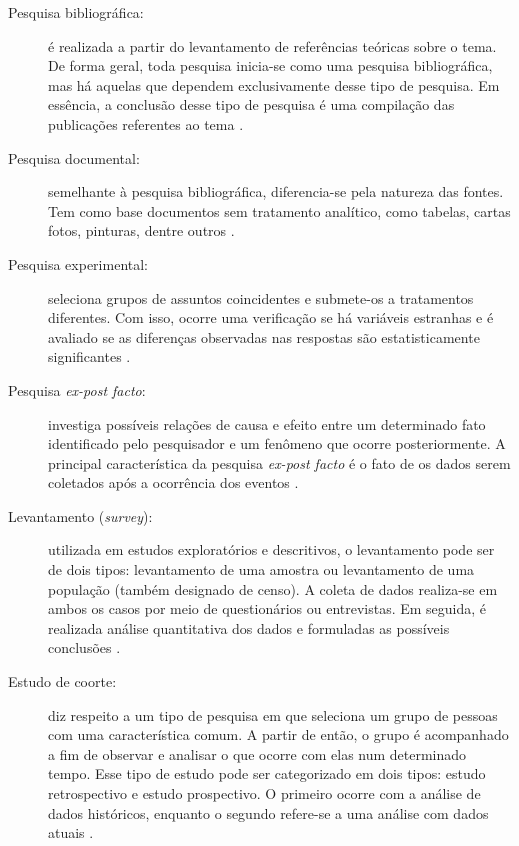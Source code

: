 \begin{description}
\item[Pesquisa bibliográfica:] é realizada a partir do levantamento de referências teóricas sobre o tema. De forma geral, toda pesquisa inicia-se como uma pesquisa bibliográfica, mas há aquelas que dependem exclusivamente desse tipo de pesquisa. Em essência, a conclusão desse tipo de pesquisa é uma compilação das publicações referentes ao tema \cite{prodanov2013}.  

\item[Pesquisa documental:] semelhante à pesquisa bibliográfica, diferencia-se pela natureza das fontes. Tem como base documentos sem tratamento analítico, como tabelas, cartas fotos, pinturas, dentre outros \cite{gil2002}. 

\item[Pesquisa experimental:] seleciona grupos de assuntos coincidentes e submete-os a tratamentos diferentes. Com isso, ocorre uma verificação se há variáveis estranhas e é avaliado se as diferenças observadas nas respostas são estatisticamente significantes \cite{tafner2007}.

\item[Pesquisa \textit{ex-post facto}:] investiga possíveis relações de causa e efeito entre um determinado fato identificado pelo pesquisador e um fenômeno que ocorre posteriormente. A principal característica da pesquisa \textit{ex-post facto} é o fato de os dados serem coletados após a ocorrência dos eventos \cite{gil2002}.

\item[Levantamento (\textit{survey}):] utilizada em estudos exploratórios e descritivos, o levantamento pode ser de dois tipos: levantamento de uma amostra ou levantamento de uma população (também designado de censo). A coleta de dados realiza-se em ambos os casos por meio de questionários ou entrevistas. Em seguida, é realizada análise quantitativa dos dados e formuladas as possíveis conclusões \cite{prodanov2013}.

\item[Estudo de coorte:] diz respeito a um tipo de pesquisa em que seleciona um grupo de pessoas com uma característica comum. A partir de então, o grupo é acompanhado a fim de observar e analisar o que ocorre com elas num determinado tempo. Esse tipo de estudo pode ser categorizado em dois tipos: estudo retrospectivo e estudo prospectivo. O primeiro ocorre com a análise de dados históricos, enquanto o segundo refere-se a uma análise com dados atuais \cite{gil2002}.   


\end{description}
